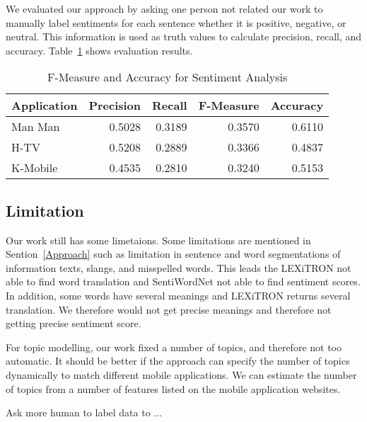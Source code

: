 We evaluated our approach by asking one person not related our work to manually label sentiments for each sentence whether it is positive, negative, or neutral. This information is used as truth values to calculate precision, recall, and accuracy. Table~\ref{table:f-measureSenti} shows evaluation results.

\begin{table}[h]
	\caption{F-Measure and Accuracy for Sentiment Analysis}
	\label{table:f-measureSenti}
	\centering
	\begin{tabular}{|l|r|r|r|r|}
		\hline
		\multicolumn{1}{|c|}{\textbf{Application}} &
		\multicolumn{1}{|c|}{\textbf{Precision}} &
		\multicolumn{1}{|c|}{\textbf{Recall}} &
		\multicolumn{1}{|c|}{\textbf{F-Measure}} &
		\multicolumn{1}{|c|}{\textbf{Accuracy}} \\
		\hline
		Man Man & 0.5028 & 0.3189 & 0.3570 & 0.6110\\
		\hline
		H-TV & 0.5208 & 0.2889 & 0.3366 & 0.4837 \\
		\hline
		K-Mobile & 0.4535 & 0.2810 & 0.3240 & 0.5153 \\
		\hline
	\end{tabular}
\end{table}

\subsection*{Limitation}
Our work still has some limetaions. Some limitations are mentioned in Sention~\ref{Approach} such as limitation in sentence and word segmentations of information texts, slangs, and misspelled words. This leads the LEXiTRON not able to find word translation and SentiWordNet not able to find sentiment scores. In addition, some words have several meanings and LEXiTRON returns several translation. We therefore would not get precise meanings and therefore not getting precise sentiment score.

For topic modelling, our work fixed a number of topics, and therefore not too automatic. It should be better if the approach can specify the number of topics dynamically to match different mobile applications. We can estimate the number of topics from a number of features listed on the mobile application websites.

Ask more human to label data to ...


